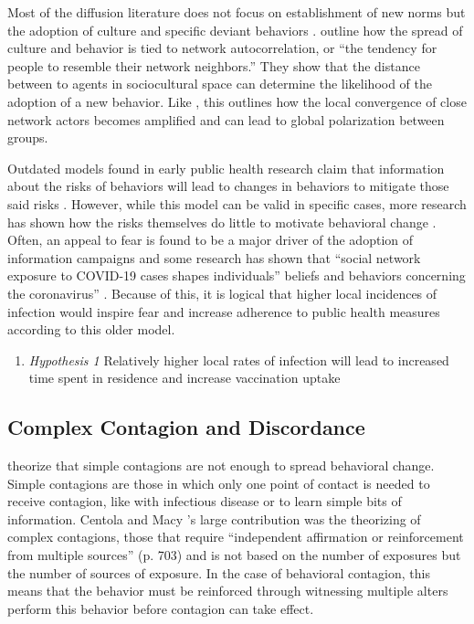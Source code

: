Most of the diffusion literature does not focus on establishment of new norms
but the adoption of culture and specific deviant behaviors 
\citep[see][for an exception]{centolaSpontaneousEmergenceConventions2015}. 
\citet{dellapostaWhyLiberalsDrink2015} outline how the spread of culture
and behavior is tied to network autocorrelation, or ``the tendency for people to
resemble their network neighbors.'' They show that the distance between to agents
in sociocultural space can determine the likelihood of the adoption of a new
behavior. Like \citet{axelrodDisseminationCultureModel1997}, this outlines
how the local convergence of close network actors becomes amplified and can
lead to global polarization between groups.

Outdated models found in early public health research claim that information
about the risks of behaviors will lead to changes in behaviors to mitigate those
said risks \citep[e.g.][]{flay_etal80}. However, while this model can be valid in specific
cases, more research has shown how the risks themselves do little to motivate
behavioral change \citep{witte_allen00,wolburg06}. Often, an appeal to fear is
found to be a major driver of the adoption of information campaigns and some
research has shown that ``social network exposure to COVID-19 cases shapes
individuals'' beliefs and behaviors concerning the coronavirus'' \citep{bailey_etal20}. Because of this, it is logical that higher local incidences of
infection would inspire fear and increase adherence to public health measures
according to this older model.

\begin{enumerate}
\def\labelenumi{(\arabic{enumi})}
\tightlist
\item
  \emph{Hypothesis 1} Relatively higher local rates of infection will lead to increased time spent in residence and increase vaccination uptake
\end{enumerate}

\hypertarget{complex-contagion-and-discordance}{%
\subsection{Complex Contagion and Discordance}\label{complex-contagion-and-discordance}}

\citep{centolaComplexContagionsWeakness2007} theorize that simple contagions are not
enough to spread behavioral change. Simple contagions are those in which only
one point of contact is needed to receive contagion, like with infectious
disease or to learn simple bits of information.
Centola and Macy \citeyearpar{centolaComplexContagionsWeakness2007}'s large contribution was the theorizing
of complex contagions, those that require ``independent affirmation or
reinforcement from multiple sources'' (p. 703) and is not based on the number of
exposures but the number of sources of exposure. In the case of behavioral
contagion, this means that the behavior must be reinforced through witnessing
multiple alters perform this behavior before contagion can take effect.

